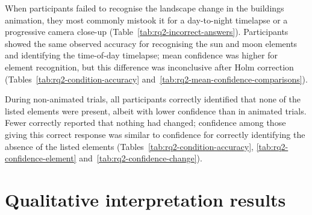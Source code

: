 \documentclass[
english,                 %
bibtex,                  %
includeExtraAbstracts, %
]{kththesis}
\numberwithin{listing}{chapter}
\begin{document}
When participants failed to recognise the landscape change in the buildings animation, they most commonly mistook it for a day-to-night timelapse or a progressive camera close-up (Table~\ref{tab:rq2-incorrect-answers}). Participants showed the same observed accuracy for recognising the sun and moon elements and identifying the time-of-day timelapse; mean confidence was higher for element recognition, but this difference was inconclusive after Holm correction (Tables~\ref{tab:rq2-condition-accuracy} and~\ref{tab:rq2-mean-confidence-comparisons}).

During non-animated trials, all participants correctly identified that none of the listed elements were present, albeit with lower confidence than in animated trials. Fewer correctly reported that nothing had changed; confidence among those giving this correct response was similar to confidence for correctly identifying the absence of the listed elements (Tables~\ref{tab:rq2-condition-accuracy}, \ref{tab:rq2-confidence-element} and~\ref{tab:rq2-confidence-change}).

\section{Qualitative interpretation results}
\label{sec:rq3-interpretation-results}
\end{document}
